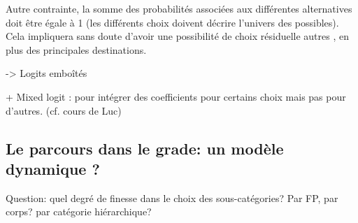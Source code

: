 \documentclass[11pt,a4paper]{article}
\begin{document}
Autre contrainte, la somme des probabilités associées aux différentes alternatives doit être égale à 1 (les différents choix doivent décrire l'univers des possibles). Cela impliquera sans doute d'avoir une possibilité de choix résiduelle \og autres \fg{}, en plus des principales destinations. 

-> Logits emboîtés

+ Mixed logit : pour intégrer des coefficients pour certains choix mais pas pour d'autres. (cf. cours de Luc)


\subsection{Le parcours dans le grade: un modèle dynamique ?}





Question: quel degré de finesse dans le choix des sous-catégories? 
Par FP, par corps? par catégorie hiérarchique? 




\ifx\isEmbedded\undefined
\newpage
 

\end{document}
